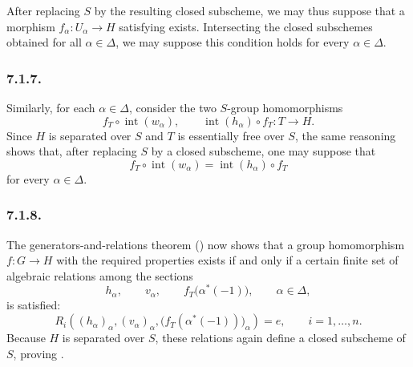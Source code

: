 After replacing \(S\) by the resulting closed subscheme, we may thus
suppose that a morphism \(f_\alpha:U_\alpha\to H\) satisfying 
exists. Intersecting the closed subschemes obtained for all
\(\alpha\in\Delta\), we may suppose this condition holds for every
\(\alpha\in\Delta\).

\subsubsection*{7.1.7.}

Similarly, for each \(\alpha\in\Delta\), consider the two
\(S\)-group homomorphisms
\[
  f_T\circ\operatorname{int}(w_\alpha),
  \qquad
  \operatorname{int}(h_\alpha)\circ f_T
  :T\longrightarrow H.
\]
Since \(H\) is separated over \(S\) and \(T\) is essentially free over
\(S\), the same reasoning shows that, after replacing \(S\) by a
closed subscheme, one may suppose that
\[
  f_T\circ\operatorname{int}(w_\alpha)
  =
  \operatorname{int}(h_\alpha)\circ f_T
\]
for every \(\alpha\in\Delta\).

\subsubsection*{7.1.8.}

The generators-and-relations theorem () now shows that
a group homomorphism \(f:G\to H\) with the required properties exists
if and only if a certain finite set of algebraic relations among the
sections
\[
  h_\alpha,\qquad
  v_\alpha,\qquad
  f_T\bigl(\alpha^*(-1)\bigr),
  \qquad \alpha\in\Delta,
\]
is satisfied:
\[
  R_i\!\left(
    (h_\alpha)_\alpha,
    (v_\alpha)_\alpha,
    \bigl(f_T(\alpha^*(-1))\bigr)_\alpha
  \right)=e,
  \qquad i=1,\ldots,n.
\]
Because \(H\) is separated over \(S\), these relations again define a
closed subscheme of \(S\), proving .

